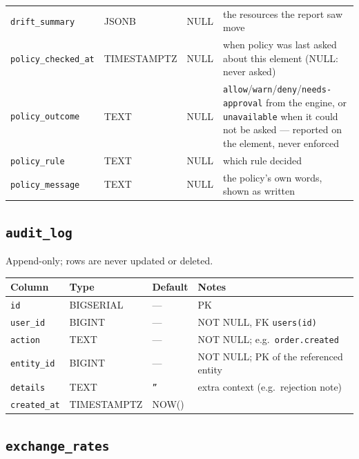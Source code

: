 \documentclass[12pt,a4paper,twoside]{report}
\newcommand{\code}[1]{\texttt{#1}}
\begin{document}
\begin{table}[H]
\begin{tabular}{@{}llll@{}}
    \code{drift\_summary}         & JSONB & NULL & the resources the report saw move \\
    \code{policy\_checked\_at}    & TIMESTAMPTZ & NULL & when policy was last asked about this element (NULL: never asked) \\
    \code{policy\_outcome}        & TEXT & NULL & \code{allow}/\code{warn}/\code{deny}/\code{needs-approval} from the engine, or \code{unavailable} when it could not be asked --- reported on the element, never enforced \\
    \code{policy\_rule}           & TEXT & NULL & which rule decided \\
    \code{policy\_message}        & TEXT & NULL & the policy's own words, shown as written \\
    \bottomrule
  \end{tabular}
\end{table}

\subsection*{\texttt{audit\_log}}

Append-only; rows are never updated or deleted.

\begin{table}[H]
  \centering\small
  \begin{tabular}{@{}llll@{}}
    \toprule
    \textbf{Column} & \textbf{Type} & \textbf{Default} & \textbf{Notes} \\
    \midrule
    \code{id}         & BIGSERIAL   & ---       & PK \\
    \code{user\_id}   & BIGINT      & ---       & NOT NULL, FK \textrightarrow{} \code{users(id)} \\
    \code{action}     & TEXT        & ---       & NOT NULL; e.g.\ \code{order.created} \\
    \code{entity\_id} & BIGINT      & ---       & NOT NULL; PK of the referenced entity \\
    \code{details}    & TEXT        & \code{''} & extra context (e.g.\ rejection note) \\
    \code{created\_at}& TIMESTAMPTZ & NOW()     & \\
    \bottomrule
  \end{tabular}
\end{table}

\subsection*{\texttt{exchange\_rates}}
\end{document}
